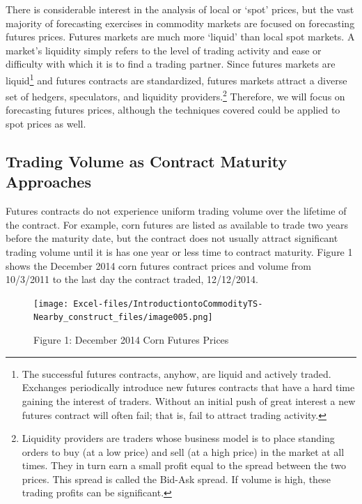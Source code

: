 \documentclass[
  letterpaper,
  DIV=11,
  numbers=noendperiod]{scrreprt}
\begin{document}
There is considerable interest in the analysis of local or `spot'
prices, but the vast majority of forecasting exercises in commodity
markets are focused on forecasting futures prices. Futures markets are
much more `liquid' than local spot markets. A market's liquidity simply
refers to the level of trading activity and ease or difficulty with
which it is to find a trading partner. Since futures markets are
liquid\footnote{The successful futures contracts, anyhow, are liquid and
  actively traded. Exchanges periodically introduce new futures
  contracts that have a hard time gaining the interest of traders.
  Without an initial push of great interest a new futures contract will
  often fail; that is, fail to attract trading activity.} and futures
contracts are standardized, futures markets attract a diverse set of
hedgers, speculators, and liquidity providers.\footnote{Liquidity
  providers are traders whose business model is to place standing orders
  to buy (at a low price) and sell (at a high price) in the market at
  all times. They in turn earn a small profit equal to the spread
  between the two prices. This spread is called the Bid-Ask spread. If
  volume is high, these trading profits can be significant.} Therefore,
we will focus on forecasting futures prices, although the techniques
covered could be applied to spot prices as well.

\subsection{Trading Volume as Contract Maturity
Approaches}\label{trading-volume-as-contract-maturity-approaches}

Futures contracts do not experience uniform trading volume over the
lifetime of the contract. For example, corn futures are listed as
available to trade two years before the maturity date, but the contract
does not usually attract significant trading volume until it is has one
year or less time to contract maturity. Figure 1 shows the December 2014
corn futures contract prices and volume from 10/3/2011 to the last day
the contract traded, 12/12/2014.

\begin{figure}[H]

{\centering \texttt{[image: Excel-files/IntroductiontoCommodityTS-Nearby\_construct\_files/image005.png]}

}

\caption{Figure 1: December 2014 Corn Futures Prices}

\end{figure}%
\end{document}
